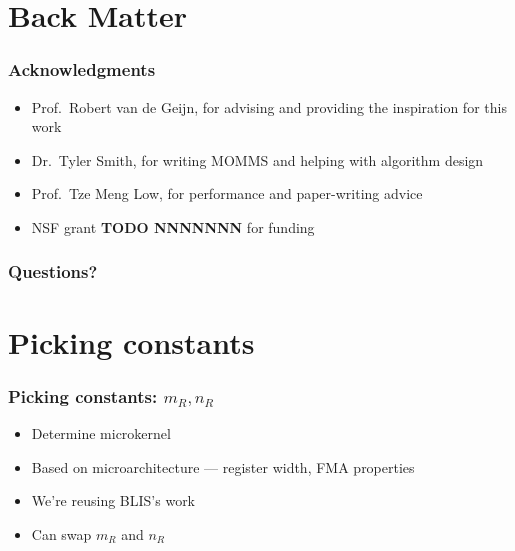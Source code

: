\documentclass{beamer}
\begin{document}
\section{Back Matter}
\begin{frame}
  \frametitle{Acknowledgments}
  \begin{itemize}
  \item Prof.\ Robert van de Geijn, for advising and providing the inspiration for this work
  \item Dr.\ Tyler Smith, for writing MOMMS and helping with algorithm design
  \item Prof.\ Tze Meng Low,  for performance and paper-writing advice
  \item NSF grant \textbf{TODO NNNNNNN} for funding
  \end{itemize}
\end{frame}

\begin{frame}
  \frametitle{Questions?}
\end{frame}

\section{Picking constants}
\begin{frame}
  \frametitle{Picking constants: $m_R, n_R$}
  \begin{itemize}
  \item Determine microkernel
  \item Based on microarchitecture --- register width, FMA properties
  \item We're reusing BLIS's work
  \item Can swap $m_R$ and $n_R$
  \end{itemize}
\end{frame}
\end{document}

